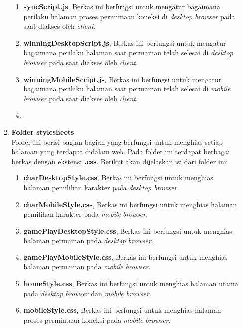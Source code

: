 \begin{enumerate}
\begin{enumerate}
\begin{enumerate}
			\item \textbf{syncScript.js}, Berkas ini berfungsi untuk mengatur bagaimana perilaku halaman proses permintaan koneksi di \textit{desktop browser} pada saat diakses oleh \textit{client}.
			
			\item \textbf{winningDesktopScript.js}, Berkas ini berfungsi untuk mengatur bagaimana perilaku halaman saat permainan telah selesai di \textit{desktop browser} pada saat diakses oleh \textit{client}.
			
			\item \textbf{winningMobileScript.js}, Berkas ini berfungsi untuk mengatur bagaimana perilaku halaman saat permainan telah selesai di \textit{mobile browser} pada saat diakses oleh \textit{client}.
			
			\item 
		\end{enumerate}
		\item \textbf{Folder stylesheets} \\ 
		Folder ini berisi bagian-bagian yang berfungsi untuk menghias setiap halaman yang terdapat didalam web. Pada folder ini terdapat berbagai berkas dengan ekstensi \textbf{.css}. Berikut akan dijelaskan isi dari folder ini:
		
		\begin{enumerate}
			\item \textbf{charDesktopStyle.css}, Berkas ini berfungsi untuk menghias halaman pemilihan karakter pada \textit{desktop browser}.
			
			\item \textbf{charMobileStyle.css}, Berkas ini berfungsi untuk menghias halaman pemilihan karakter pada \textit{mobile browser}.
			
			\item \textbf{gamePlayDesktopStyle.css}, Berkas ini berfungsi untuk menghias halaman permainan pada \textit{desktop browser}.
			
			\item \textbf{gamePlayMobileStyle.css}, Berkas ini berfungsi untuk menghias halaman permainan pada \textit{mobile browser}.
			
			\item \textbf{homeStyle.css}, Berkas ini berfungsi untuk menghias halaman utama pada \textit{desktop browser} dan \textit{mobile browser}.
			
			\item \textbf{mobileStyle.css}, Berkas ini berfungsi untuk menghias halaman proses permintaan koneksi pada \textit{mobile browser}.
			

\end{enumerate}
\end{enumerate}
\end{enumerate}
